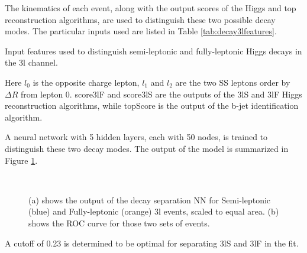The kinematics of each event, along with the output scores of the Higgs and top reconstruction algorithms, are used to distinguish these two possible decay modes. The particular inputs used are listed in Table \ref{tab:decay3lfeatures}.

\begin{table}[H]

\caption{Input features used to distinguish semi-leptonic and fully-leptonic Higgs decays in the 3l channel.}
\label{tab:decay3lfeatures}
\end{table}

Here $l_0$ is the opposite charge lepton, $l_1$ and $l_2$ are the two SS leptons order by $\Delta R$ from lepton 0. score3lF and score3lS are the outputs of the 3lS and 3lF Higgs reconstruction algorithms, while topScore is the output of the b-jet identification algorithm.

A neural network with 5 hidden layers, each with 50 nodes, is trained to distinguish these two decay modes. The output of the model is summarized in Figure \ref{fig:decayResults}.

\begin{figure}[H]
    \centering
    \\
    \caption{(a) shows the output of the decay separation NN for Semi-leptonic (blue) and Fully-leptonic (orange) 3l events, scaled to equal area. (b) shows the ROC curve for those two sets of events.}
    \label{fig:decayResults}
\end{figure}

A cutoff of 0.23 is determined to be optimal for separating 3lS and 3lF in the fit.



